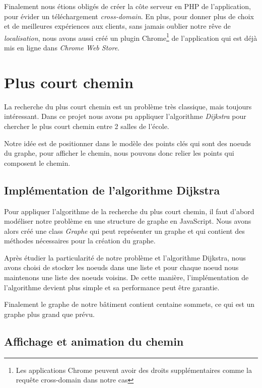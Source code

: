 \documentclass[twoside]{EPURapport}
\begin{document}
Finalement nous étions obligés de créer la côte serveur en PHP de l'application, pour évider un téléchargement \textit{cross-domain}. En plus, pour donner plus de choix et de meilleures expériences aux clients, sans jamais oublier notre rêve de \textit{localisation}, nous avons aussi créé un plugin Chrome\footnote{Les applications Chrome peuvent avoir des droits supplémentaires comme la requête cross-domain dans notre cas} de l'application qui est déjà mis en ligne dans \textit{Chrome Web Store}.%

\section{Plus court chemin}
La recherche du plus court chemin est un problème très classique, mais toujours intéressant. Dans ce projet nous avons pu appliquer l'algorithme \textit{Dijkstra} pour chercher le plus court chemin entre 2 salles de l'école. %


Notre idée est de positionner dans le modèle des points clés qui sont des noeuds du graphe, pour afficher le chemin, nous pouvons donc relier les points qui composent le chemin.

\subsection{Implémentation de l'algorithme Dijkstra}	%
Pour appliquer l'algorithme de la recherche du plus court chemin, il faut d'abord modéliser notre problème en une structure de graphe en JavaScript. Nous avons alors créé une class \textit{Graphe} qui peut représenter un graphe et qui contient des méthodes nécessaires pour la création du graphe.


Après étudier la particularité de notre problème et l'algorithme Dijkstra, nous avons choisi de stocker les noeuds dans une liste et pour chaque noeud nous maintenons une liste des noeuds voisins. De cette manière, l'implémentation de l'algorithme devient plus simple et sa performance peut être garantie.


Finalement le graphe de notre bâtiment contient centaine sommets, ce qui est un graphe plus grand que prévu.

\subsection{Affichage et animation du chemin} %
\end{document}
